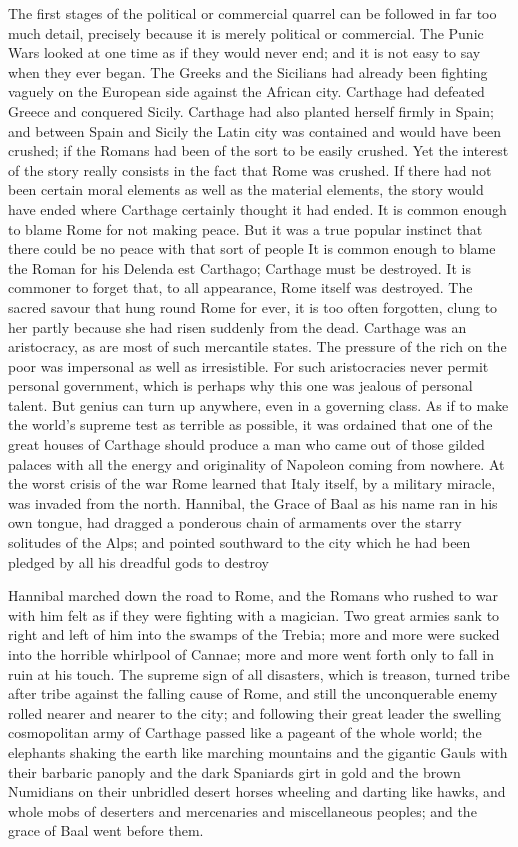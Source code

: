 The first stages of the political or commercial quarrel can be followed in far too much detail, precisely because it is merely political or commercial. The Punic Wars looked at one time as if they would never end; and it is not easy to say when they ever began. The Greeks and the Sicilians had already been fighting vaguely on the European side against the African city. Carthage had defeated Greece and conquered Sicily. Carthage had also planted herself firmly in Spain; and between Spain and Sicily the Latin city was contained and would have been crushed; if the Romans had been of the sort to be easily crushed. Yet the interest of the story really consists in the fact that Rome was crushed. If there had not been certain moral elements as well as the material elements, the story would have ended where Carthage certainly thought it had ended. It is common enough to blame Rome for not making peace. But it was a true popular instinct that there could be no peace with that sort of people It is common enough to blame the Roman for his Delenda est Carthago; Carthage must be destroyed. It is commoner to forget that, to all appearance, Rome itself was destroyed. The sacred savour that hung round Rome for ever, it is too often forgotten, clung to her partly because she had risen suddenly from the dead. Carthage was an aristocracy, as are most of such mercantile states. The pressure of the rich on the poor was impersonal as well as irresistible. For such aristocracies never permit personal government, which is perhaps why this one was jealous of personal talent. But genius can turn up anywhere, even in a governing class. As if to make the world's supreme test as terrible as possible, it was ordained that one of the great houses of Carthage should produce a man who came out of those gilded palaces with all the energy and originality of Napoleon coming from nowhere. At the worst crisis of the war Rome learned that Italy itself, by a military miracle, was invaded from the north. Hannibal, the Grace of Baal as his name ran in his own tongue, had dragged a ponderous chain of armaments over the starry solitudes of the Alps; and pointed southward to the city which he had been pledged by all his dreadful gods to destroy

Hannibal marched down the road to Rome, and the Romans who rushed to war with him felt as if they were fighting with a magician. Two great armies sank to right and left of him into the swamps of the Trebia; more and more were sucked into the horrible whirlpool of Cannae; more and more went forth only to fall in ruin at his touch. The supreme sign of all disasters, which is treason, turned tribe after tribe against the falling cause of Rome, and still the unconquerable enemy rolled nearer and nearer to the city; and following their great leader the swelling cosmopolitan army of Carthage passed like a pageant of the whole world; the elephants shaking the earth like marching mountains and the gigantic Gauls with their barbaric panoply and the dark Spaniards girt in gold and the brown Numidians on their unbridled desert horses wheeling and darting like hawks, and whole mobs of deserters and mercenaries and miscellaneous peoples; and the grace of Baal went before them.

